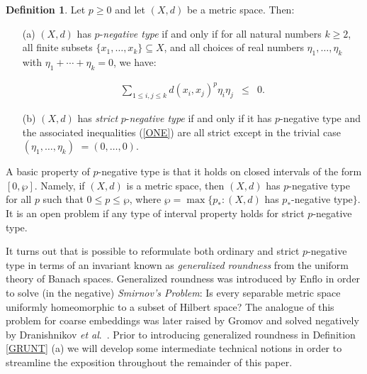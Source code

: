 \documentclass[10pt]{amsart}
\theoremstyle{definition}
\newtheorem{defn}[thm]{Definition}
\theoremstyle{remark}
\begin{document}
\begin{defn}\label{types} Let $p \geq 0$ and let $(X,d)$ be a metric space. Then:
\begin{enumerate}
\item[(a)] $(X,d)$ has $p$-{\textit{negative type}} if and only if for all natural numbers $k \geq 2$,
all finite subsets $\{x_{1}, \ldots , x_{k} \} \subseteq X$, and all choices of real numbers $\eta_{1},
\ldots, \eta_{k}$ with $\eta_{1} + \cdots + \eta_{k} = 0$, we have:

\begin{eqnarray}\label{ONE}
\sum\limits_{1 \leq i,j \leq k} d(x_{i},x_{j})^{p} \eta_{i} \eta_{j}  & \leq & 0.
\end{eqnarray}

\item[(b)] $(X,d)$ has \textit{strict} $p$-{\textit{negative type}} if and only if it has $p$-negative type
and the associated inequalities (\ref{ONE}) are all strict except in the trivial case
$(\eta_{1}, \ldots, \eta_{k})$ $= (0, \ldots, 0)$.
\end{enumerate}
\end{defn}
\noindent A basic property of $p$-negative type is that it holds on closed intervals of the form $[0,\wp]$.
Namely, if $(X,d)$ is a metric space, then $(X,d)$ has $p$-negative type for all
$p$ such that $0 \leq p \leq \wp$, where $\wp = \max \{ p_{\ast}: (X,d)$ has $p_{\ast}$-negative type$\}$. It is
an open problem if any type of interval property holds for strict $p$-negative type.

It turns out that is possible to reformulate both ordinary and strict $p$-negative type in terms of an
invariant known as \textit{generalized roundness} from the uniform theory of Banach spaces. Generalized roundness
was introduced by Enflo \cite{E} in order to solve (in the negative) \textit{Smirnov's Problem}: Is
every separable metric space uniformly homeomorphic to a subset of Hilbert space? The analogue of this
problem for coarse embeddings was later raised by Gromov \cite{G} and solved negatively by
Dranishnikov \textit{et al}.\ \cite{DGLY}. Prior to introducing generalized roundness in Definition
\ref{GRUNT} (a) we will develop some intermediate technical notions in order to streamline the
exposition throughout the remainder of this paper.
\end{document}
